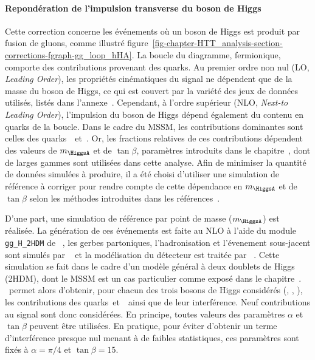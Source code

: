 \paragraph{Repondération de l'impulsion transverse du boson de Higgs}
Cette correction concerne les événements où un boson de Higgs est produit par fusion de gluons, comme illustré figure~\ref{fig-chapter-HTT_analysis-section-corrections-fgraph-gg_loop_hHA}.
La boucle du diagramme, fermionique, comporte des contributions provenant des quarks.
Au premier ordre non nul (LO, \emph{Leading Order}), les propriétés cinématiques du signal ne dépendent que de la masse du boson de Higgs, ce qui est couvert par la variété des jeux de données utilisés, listés dans l'annexe~.
Cependant, à l'ordre supérieur (NLO, \emph{Next-to Leading Order}), l'impulsion du boson de Higgs dépend également du contenu en quarks de la boucle.
Dans le cadre du MSSM, les contributions dominantes sont celles des quarks~\quarkt\ et~\quarkb.
Or, les fractions relatives de ces contributions dépendent des valeurs de $m_{\HiggsA}$ et de $\tan\beta$, paramètres introduits dans le chapitre~, dont de larges gammes sont utilisées dans cette analyse.
Afin de minimiser la quantité de données simulées à produire, il a été choisi d'utiliser une simulation de référence à corriger pour rendre compte de cette dépendance en $m_{\HiggsA}$ et de $\tan\beta$ selon les méthodes introduites dans les références~\cite{Bagnaschi:2015qta,Bagnaschi:2015bop}.
\par
D'une part, une simulation de référence par point de masse ($m_{\HiggsA}$) est réalisée.
La génération de ces événements est faite au NLO à l'aide du module \texttt{gg\_H\_2HDM} de \POWHEG~\cite{Alioli:2010xd},
les gerbes partoniques, l'hadronisation et l'évenement sous-jacent sont simulés par \PYTHIA~\cite{pythia8.2} et
la modélisation du détecteur est traitée par \GEANTfour~\cite{geant4_2003,geant4_2006,geant4_2016}.
Cette simulation se fait dans le cadre d'un modèle général à deux doublets de Higgs (2HDM), dont le MSSM est un cas particulier comme exposé dans le chapitre~.
\POWHEG\ permet alors d'obtenir, pour chacun des trois bosons de Higgs considérés (\higgs, \Higgs, \HiggsA), les contributions des quarks~\quarkt et~\quarkb\ ainsi que de leur interférence.
Neuf contributions au signal sont donc considérées.
En principe, toutes valeurs des paramètres $\alpha$ et $\tan\beta$ peuvent être utilisées.
En pratique, pour éviter d'obtenir un terme d'interférence presque nul menant à de faibles statistiques, ces paramètres sont fixés à $\alpha=\pi/4$ et $\tan\beta=15$.
